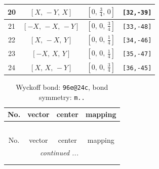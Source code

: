 \documentclass[fleqn,8pt]{jsarticle}
\begin{document}
\begin{longtable}{cccc}
20 & $\left[ X,\, - Y,\, X \right]$ & $\left[ 0,\, \frac{3}{4},\, 0 \right]$ & {\tt [32,-39]} \\ \hline
21 & $\left[ - X,\, - X,\, - Y \right]$ & $\left[ 0,\, 0,\, \frac{3}{4} \right]$ & {\tt [33,-48]} \\ \hline
22 & $\left[ X,\, - X,\, Y \right]$ & $\left[ 0,\, 0,\, \frac{1}{4} \right]$ & {\tt [34,-46]} \\ \hline
23 & $\left[ - X,\, X,\, Y \right]$ & $\left[ 0,\, 0,\, \frac{1}{4} \right]$ & {\tt [35,-47]} \\ \hline
24 & $\left[ X,\, X,\, - Y \right]$ & $\left[ 0,\, 0,\, \frac{3}{4} \right]$ & {\tt [36,-45]} \\
\end{longtable}
\renewcommand{\arraystretch}{1.2}
\begin{longtable}{cccc}
\caption{Wyckoff bond: {\tt 96e@24c}, bond symmetry: {\tt m..}}
 \\
 \hline \hline
No. & vector & center & mapping \\ \hline \endfirsthead

\multicolumn{3}{l}{\tablename\ \thetable{}} \\
 \hline \hline
No. & vector & center & mapping \\ \hline \endhead

 \hline \hline
\multicolumn{3}{r}{\footnotesize\it continued ...} \\ \endfoot

 \hline \hline
\multicolumn{3}{r}{} \\ \endlastfoot


\end{longtable}
\end{document}
